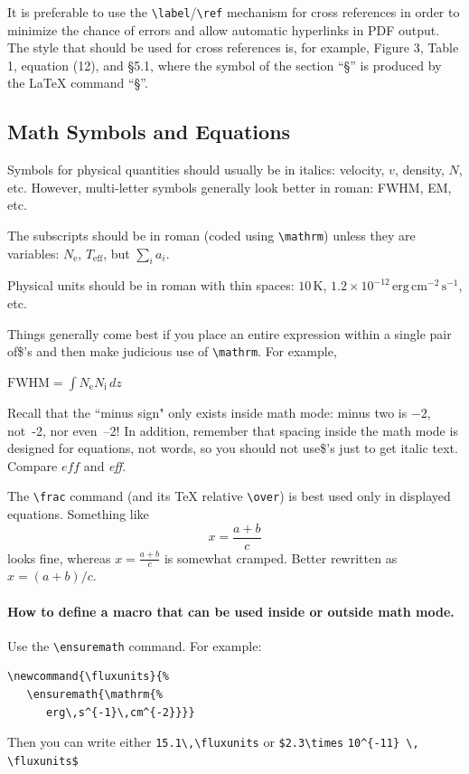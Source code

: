 \documentclass[10pt,letter,twoside]{rmaa-rho-class/rmac-rho}
\newcommand{\CS}[1]{\texttt{\textbackslash #1}}
\newenvironment{Example}
{\begin{list}{}{\setlength{\leftmargin}{10pt}\setlength{\rightmargin}{10pt}}%
  \item[]\itshape}
  {\end{list}}
\begin{document}
It is preferable to use the \CS{label}/\CS{ref} mechanism for cross references in order to minimize the chance of errors and
allow automatic hyperlinks in PDF output. The style that should be used for cross references is, for example, Figure 3, Table 1, equation (12), and \S 5.1, where the symbol of the section “§” is produced by the \LaTeX{} command “\S”.

\subsection{Math Symbols and Equations}
\label{sec:math}

Symbols for physical quantities should usually be in italics: velocity,
$v$, density, $N$, etc. However, multi-letter symbols generally look
better in roman: FWHM, EM, etc. 

The subscripts should be in roman (coded using \CS{mathrm}) unless they are variables:
$N_\mathrm{e}$, $T_\mathrm{eff}$, but $\sum_i a_i$. 

Physical units should be in roman with thin spaces: $10\,\mathrm{K}$, $1.2\times
10^{-12} \,\mathrm{erg\,cm^{-2}\,s^{-1}}$, etc. 

Things generally come
best if you place an entire expression within a single pair of\$'s and then make judicious use of \CS{mathrm}. For example,
\begin{Example}
  $ \mathrm{FWHM} = \int N_\mathrm{e} N_\mathrm{i} \, dz $ 
\end{Example}

Recall that the ``minus sign" only exists inside math mode: minus two is $-2$, not~-2, nor \hbox{even --2!} In addition, remember that spacing inside the math mode is designed for equations, not words, so you should not use\$'s just to get italic text. Compare $eff$ and \textit{eff}. 

The \CS{frac} command (and its \TeX{} relative \CS{over}) is best used only in displayed equations. Something like 
\begin{equation}
  \label{eq:one}
  x = \frac { a + b } { c } 
\end{equation}
looks fine, whereas $x = \frac { a + b } { c }$ is somewhat cramped. Better rewritten as $x = (a + b) / c $. 

\paragraph{How to define a macro that can be used inside or outside  math mode.} Use the \CS{ensuremath} command. For example: 
\begin{verbatim}
\newcommand{\fluxunits}{%
   \ensuremath{\mathrm{%
      erg\,s^{-1}\,cm^{-2}}}}
\end{verbatim}
Then you can write either \verb+15.1\,\fluxunits+ or
\verb+$2.3\times+ \verb+10^{-11} \,+ \verb+\fluxunits$+
\end{document}
